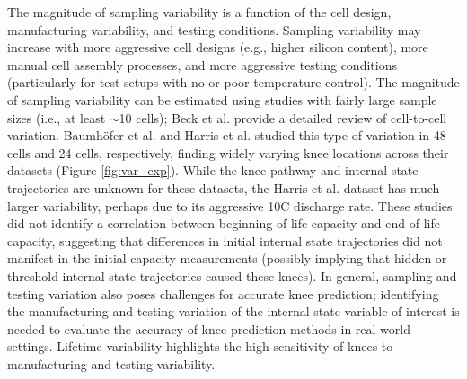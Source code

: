 \documentclass[journal=jpclcd,manuscript=article]{achemso}
\begin{document}
The magnitude of sampling variability is a function of the cell design, manufacturing variability, and testing conditions. Sampling variability may increase with more aggressive cell designs (e.g., higher silicon content), more manual cell assembly processes, and more aggressive testing conditions (particularly for test setups with no or poor temperature control). The magnitude of sampling variability can be estimated using studies with fairly large sample sizes (i.e., at least $\sim$10 cells)\cite{dechent_estimation_2021}{}; Beck et al.\cite{beck_inhomogeneities_2021} provide a detailed review of cell-to-cell variation. Baumhöfer et al.\cite{baumhofer_production_2014} and Harris et al.\cite{harris_failure_2017} studied this type of variation in 48 cells and 24 cells, respectively, finding widely varying knee locations across their datasets (Figure \ref{fig:var_exp}).
While the knee pathway and internal state trajectories are unknown for these datasets, the Harris et al.\cite{harris_failure_2017} dataset has much larger variability, perhaps due to its aggressive 10C discharge rate.
These studies did not identify a correlation between beginning-of-life capacity and end-of-life capacity, suggesting that differences in initial internal state trajectories did not manifest in the initial capacity measurements (possibly implying that hidden or threshold internal state trajectories caused these knees). In general, sampling and testing variation also poses challenges for accurate knee prediction; identifying the manufacturing and testing variation of the internal state variable of interest is needed to evaluate the accuracy of knee prediction methods in real-world settings.
Lifetime variability highlights the high sensitivity of knees to manufacturing and testing variability.
\end{document}
